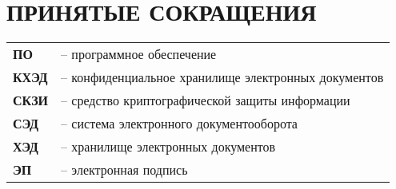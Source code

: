 \chapter*{ПРИНЯТЫЕ СОКРАЩЕНИЯ}							%

\begin{tabular}{ll}
\textbf{ПО} & -- программное обеспечение \\
\textbf{КХЭД} & -- конфиденциальное хранилище электронных документов \\
\textbf{СКЗИ} & -- средство криптографической защиты информации \\
\textbf{СЭД} & -- система электронного документооборота \\
\textbf{ХЭД} & -- хранилище электронных документов \\
\textbf{ЭП} & -- электронная подпись \\
\end{tabular}


\clearpage